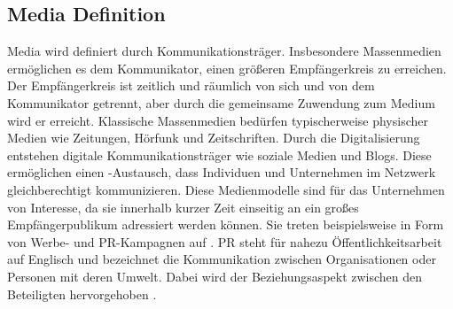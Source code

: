 \subsection{Media Definition}
\label{Media-KanäleDefinition}
Media wird definiert durch Kommunikationsträger. Insbesondere Massenmedien ermöglichen es dem Kommunikator, einen größeren Empfängerkreis zu erreichen. Der Empfängerkreis ist zeitlich und räumlich von sich und von dem Kommunikator getrennt, aber durch die gemeinsame Zuwendung zum Medium wird er erreicht. Klassische Massenmedien bedürfen typischerweise physischer Medien wie Zeitungen, Hörfunk und Zeitschriften. Durch die Digitalisierung entstehen digitale Kommunikationsträger wie soziale Medien und Blogs. Diese ermöglichen einen -Austausch, dass Individuen und Unternehmen im Netzwerk gleichberechtigt kommunizieren. Diese Medienmodelle sind für das Unternehmen von Interesse, da sie innerhalb kurzer Zeit einseitig an ein großes Empfängerpublikum adressiert werden können. Sie treten beispielsweise in Form von Werbe- und \ac{PR}-Kampagnen auf \cite{Kleinjohann2024}. \ac{PR} steht für nahezu Öffentlichkeitsarbeit auf Englisch und bezeichnet die Kommunikation zwischen Organisationen oder Personen mit deren Umwelt. Dabei wird der Beziehungsaspekt zwischen den Beteiligten hervorgehoben \cite{Büsching2014}. \\\\

